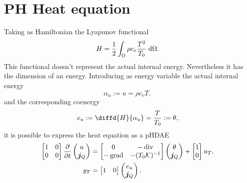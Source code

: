 \documentclass[11t]{article}
\DeclareMathOperator*{\grad}{grad}
\renewcommand{\div}{\operatorname{div}}
\begin{document}
\section{PH Heat equation}
Taking as Hamiltonian the Lyapunov functional
\begin{equation*}
H = \frac{1}{2} \int_{\Omega} \rho c_v \frac{T^2}{T_0} \d\Omega.
\end{equation*}
This functional doesn't represent the actual internal energy. Nevertheless it has the dimension of an energy. Introducing as energy variable the actual internal energy
\begin{equation}
	\alpha_u := u =  \rho c_v T,
\end{equation}
and the corresponding coenergy 
\begin{equation}
	e_u := \diffd{H}{\alpha_u} = \frac{T}{T_0} := \theta,
\end{equation}
it is possible to express the heat equation as a pHDAE
\begin{equation}
\begin{aligned}
\begin{bmatrix}
1 & 0 \\
0 & 0 \\
\end{bmatrix}
\diffp{}{t}
\begin{pmatrix}
u \\
\bm{j}_Q \\
\end{pmatrix} &= 
\begin{bmatrix}
0 & -\div \\
-\grad & - (T_0 \mathcal{K})^{-1} \\
\end{bmatrix}
\begin{pmatrix}
\theta \\
\bm{j}_Q \\
\end{pmatrix} + 
\begin{bmatrix}
1 \\
0 \\
\end{bmatrix}u_T, \\
y_T &= \begin{bmatrix}
1 & 0 \\
\end{bmatrix}\begin{pmatrix}
e_u \\
\bm{j}_Q \\
\end{pmatrix}.
\end{aligned}
\end{equation} 
\end{document}
